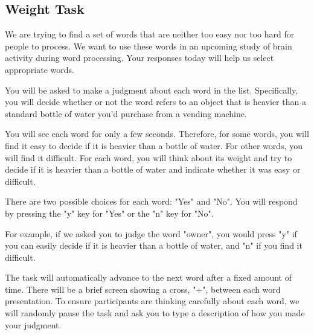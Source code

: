 \documentclass[man,natbib,floatsintext]{apa6} %
\begin{document}
\subsection{Weight Task}
\begin{displayquote}
We are trying to find a set of words that are neither too easy nor too hard for people to process. We want to use these words in an upcoming study of brain activity during word processing. Your responses today will help us select appropriate words.

You will be asked to make a judgment about each word in the list. Specifically, you will decide whether or not the word refers to an object that is heavier than a standard bottle of water you'd purchase from a vending machine.

You will see each word for only a few seconds. Therefore, for some words, you will find it easy to decide if it is heavier than a bottle of water. For other words, you will find it difficult. For each word, you will think about its weight and try to decide if it is heavier than a bottle of water and indicate whether it was easy or difficult.

There are two possible choices for each word: "Yes" and "No". You will respond by pressing the "y" key for "Yes" or the "n" key for "No".

For example, if we asked you to judge the word "owner", you would press "y" if you can easily decide if it is heavier than a bottle of water, and "n" if you find it difficult.

The task will automatically advance to the next word after a fixed amount of time. There will be a brief screen showing a cross, "+", between each word presentation.
To ensure participants are thinking carefully about each word, we will randomly pause the task and ask you to type a description of how you made your judgment.
\end{displayquote}
\end{document}
